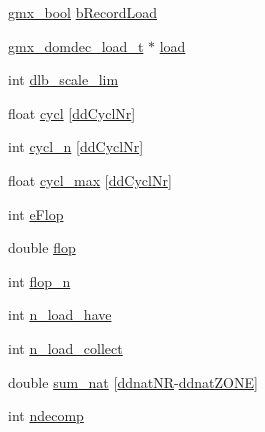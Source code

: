 \begin{DoxyCompactItemize}
\item 
\hyperlink{include_2types_2simple_8h_a8fddad319f226e856400d190198d5151}{gmx\-\_\-bool} \hyperlink{structgmx__domdec__comm_aede00e314ba3b39bb8661939b6b60582}{b\-Record\-Load}
\item 
\hyperlink{structgmx__domdec__load__t}{gmx\-\_\-domdec\-\_\-load\-\_\-t} $\ast$ \hyperlink{structgmx__domdec__comm_a50d6423ab281242ab41644f0362c73a5}{load}
\item 
int \hyperlink{structgmx__domdec__comm_ac4babe31d5562c1062f37868de47d446}{dlb\-\_\-scale\-\_\-lim}
\item 
float \hyperlink{structgmx__domdec__comm_a45e971124019a3d6d16bedd2acae967d}{cycl} \mbox{[}\hyperlink{share_2template_2gromacs_2domdec_8h_a1812ab31015cef0a41c6d4f3ae07f13dab0d3da418762331cb4e99d05733a617e}{dd\-Cycl\-Nr}\mbox{]}
\item 
int \hyperlink{structgmx__domdec__comm_a2a472490f2b333c9f11f34b9882280dc}{cycl\-\_\-n} \mbox{[}\hyperlink{share_2template_2gromacs_2domdec_8h_a1812ab31015cef0a41c6d4f3ae07f13dab0d3da418762331cb4e99d05733a617e}{dd\-Cycl\-Nr}\mbox{]}
\item 
float \hyperlink{structgmx__domdec__comm_a9f14fdcf7b914a9b47e6e9375eecc915}{cycl\-\_\-max} \mbox{[}\hyperlink{share_2template_2gromacs_2domdec_8h_a1812ab31015cef0a41c6d4f3ae07f13dab0d3da418762331cb4e99d05733a617e}{dd\-Cycl\-Nr}\mbox{]}
\item 
int \hyperlink{structgmx__domdec__comm_ac23d2ec3fc3fe0675696cee2194f601d}{e\-Flop}
\item 
double \hyperlink{structgmx__domdec__comm_a368561576f74c094fbd589f61ff1821d}{flop}
\item 
int \hyperlink{structgmx__domdec__comm_abb6cc4a46b2f0b1df5789ca410115963}{flop\-\_\-n}
\item 
int \hyperlink{structgmx__domdec__comm_a555c834cdf65576484ff83ffdfe8d709}{n\-\_\-load\-\_\-have}
\item 
int \hyperlink{structgmx__domdec__comm_a5c9358dfcabc3c30602ba0c3379e943b}{n\-\_\-load\-\_\-collect}
\item 
double \hyperlink{structgmx__domdec__comm_a35fa9c9117734b33d59e9c54973780f5}{sum\-\_\-nat} \mbox{[}\hyperlink{domdec_8c_a2215bf270a4991ca057bb6efb294846ba5144222b5204cffa3cbfa75eb4ef48e6}{ddnat\-N\-R}-\/\hyperlink{domdec_8c_a2215bf270a4991ca057bb6efb294846ba8e58cbb66400580b6f58ee5ac75b2854}{ddnat\-Z\-O\-N\-E}\mbox{]}
\item 
int \hyperlink{structgmx__domdec__comm_a09cf16b2ea0c2274d93e4f7ae4cc6b23}{ndecomp}
\item 

\end{DoxyCompactItemize}
